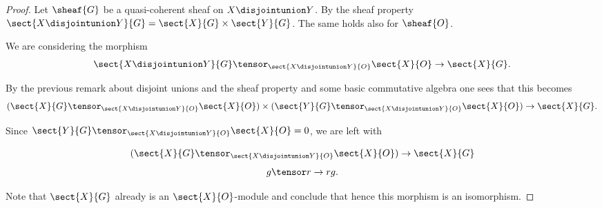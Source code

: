 
\begin{proof}
Let $\sheaf{G}$ be a quasi-coherent sheaf on $X \disjointunion Y$.
By the sheaf property $\sect{X \disjointunion Y}{G} = \sect{X}{G} \times \sect{Y}{G}$.
The same holds also for $\sheaf{O}$.

We are considering the morphism
\[
\sect{X \disjointunion Y}{G} \tensor_{\sect{X \disjointunion Y}{O}} \sect{X}{O} \rightarrow \sect{X}{G}.
\]

By the previous remark about disjoint unions and the sheaf property and some basic commutative algebra one sees that this becomes 
\[
(\sect{X}{G} \tensor_{\sect{X \disjointunion Y}{O}} \sect{X}{O}) 
\times (\sect{Y}{G} \tensor_{\sect{X \disjointunion Y}{O}} \sect{X}{O}) \rightarrow \sect{X}{G}.
\]

Since $\sect{Y}{G} \tensor_{\sect{X \disjointunion Y}{O}} \sect{X}{O} = 0$, we are left with

\[
(\sect{X}{G} \tensor_{\sect{X \disjointunion Y}{O}} \sect{X}{O}) \rightarrow \sect{X}{G}
\]
\[
g \tensor r \rightarrow rg.
\]

Note that $\sect{X}{G}$ already is an $\sect{X}{O}$-module and conclude that hence this morphism is an isomorphism.
\end{proof}